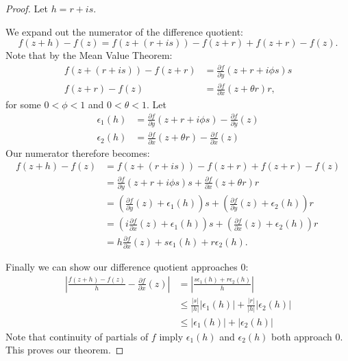 \documentclass[notes]{subfile}
\begin{document}
\begin{proof}
    Let $h = r+is$.

    We expand out the numerator of the difference quotient:
    \[ f(z+h) - f(z) = f(z + (r+is)) - f(z+r) + f(z+r) - f(z). \]
    Note that by the Mean Value Theorem:
    \begin{align*}
        f(z + (r+is)) - f(z+r) &= \frac{\partial f}{\partial y} (z + r + i\phi s) s \\
        f(z + r) - f(z) &= \frac{\partial f}{\partial x} (z + \theta r) r,
    \end{align*}
    for some $0 < \phi < 1$ and $0 < \theta < 1$.
    Let
    \begin{align*}
        \epsilon_1 (h) &= \frac{\partial f}{\partial y} (z + r + i\phi s) - \frac{\partial f}{\partial y}(z) \\
        \epsilon_2 (h) &= \frac{\partial f}{\partial x} (z + \theta r) - \frac{\partial f}{\partial x} (z)
    \end{align*}
    Our numerator therefore becomes:
    \begin{align*}
        f(z+h) - f(z) &= f(z + (r+is)) - f(z+r) + f(z+r) - f(z) \\
        &= \frac{\partial f}{\partial y} (z + r + i\phi s) s + \frac{\partial f}{\partial x} (z + \theta r) r \\
        &= \left( \frac{\partial f}{\partial y}(z) + \epsilon_1 (h) \right)s + \left(\frac{\partial f}{\partial y}(z) + \epsilon_2 (h) \right)r \\
        &= \left( i\frac{\partial f}{\partial x} (z) + \epsilon_1(h) \right) s + 
        \left( \frac{\partial f}{\partial x} (z) + \epsilon_2(h) \right ) r \tag{By Cauchy-Riemann} \\
        &= h \frac{\partial f}{\partial x} (z) + s \epsilon_1(h) + r \epsilon_2(h).
     \end{align*}

     \noindent
     Finally we can show our difference quotient approaches $0$:
     \begin{align*}
        \left| \frac{f(z+h) - f(z)}{h} - \frac{\partial f}{\partial x} (z) \right|
        &= \left| \frac{s \epsilon_1(h) + r \epsilon_2 (h)}{h} \right| \\
        &\le \frac{|s|}{|h|} |\epsilon_1(h)| + \frac{|r|}{|h|} |\epsilon_2(h)| \tag{Triangle Inequality} \\
        &\le |\epsilon_1(h)| + |\epsilon_2(h)|
     \end{align*}
     Note that continuity of partials of $f$ imply $\epsilon_1(h)$ and $\epsilon_2(h)$ both approach $0$.
     This proves our theorem.
\end{proof} 
\end{document}

